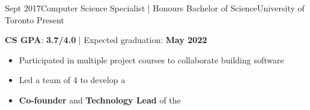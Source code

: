 %
%
%


\begin{experiences}
  \university
    {Sept 2017}{Computer Science Specialist | Honours Bachelor of Science}{University of Toronto}
    {Present} {
                      \textbf{CS GPA}: \textbf{3.7/4.0} | Expected graduation: \textbf{May 2022}
                      \begin{itemize}
                        \setlength\itemsep{0.2em}
                        \item Participated in multiple project courses to collaborate building software
                        \item Led a team of 4 to develop a 
                        \item \textbf{Co-founder} and \textbf{Technology Lead} of the 
                      \end{itemize}
                    }
\end{experiences}
